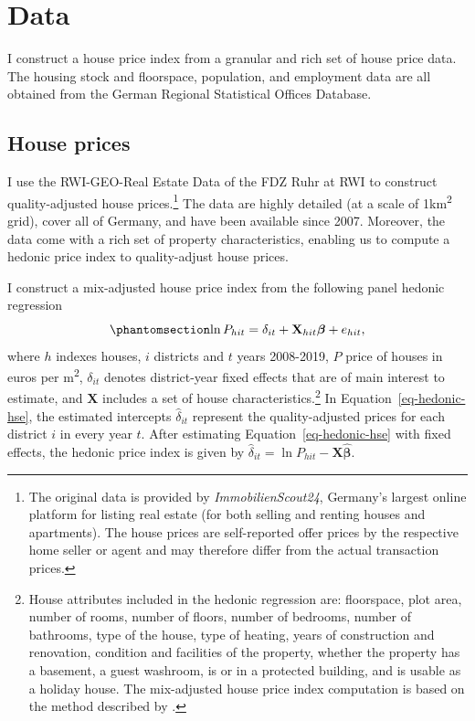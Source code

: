 \documentclass[
  12pt,
]{article}
\begin{document}
\section{Data}\label{data}

I construct a house price index from a granular and rich set of house
price data. The housing stock and floorspace, population, and employment
data are all obtained from the German Regional Statistical Offices
Database.

\subsection{House prices}\label{sec-hedonic-hse}

I use the RWI-GEO-Real Estate Data of the FDZ Ruhr at RWI
\citep{rwi_redhk_2020} to construct quality-adjusted house
prices.\footnote{The original data is provided by
  \emph{ImmobilienScout24}, Germany's largest online platform for
  listing real estate (for both selling and renting houses and
  apartments). The house prices are self-reported offer prices by the
  respective home seller or agent and may therefore differ from the
  actual transaction prices.} The data are highly detailed (at a scale
of 1km\textsuperscript{2} grid), cover all of Germany, and have been
available since 2007. Moreover, the data come with a rich set of
property characteristics, enabling us to compute a hedonic price index
to quality-adjust house prices.

I construct a mix-adjusted house price index from the following panel
hedonic regression
\begin{equation}\phantomsection\label{eq-hedonic-hse}{
\ln P_{hit} = \delta_{it} + \mathbf{X}_{hit}\boldsymbol{\beta} + e_{hit},
}\end{equation} where \(h\) indexes houses, \(i\) districts and \(t\)
years 2008-2019, \(P\) price of houses in euros per
m\textsuperscript{2}, \(\delta_{it}\) denotes district-year fixed
effects that are of main interest to estimate, and \(\mathbf{X}\)
includes a set of house characteristics.\footnote{House attributes
  included in the hedonic regression are: floorspace, plot area, number
  of rooms, number of floors, number of bedrooms, number of bathrooms,
  type of the house, type of heating, years of construction and
  renovation, condition and facilities of the property, whether the
  property has a basement, a guest washroom, is or in a protected
  building, and is usable as a holiday house. The mix-adjusted house
  price index computation is based on the method described by
  \citet{ahlfeldt_etal_2020}.} In Equation~\ref{eq-hedonic-hse}, the
estimated intercepts \(\widehat{\delta}_{it}\) represent the
quality-adjusted prices for each district \(i\) in every year \(t\).
After estimating Equation~\ref{eq-hedonic-hse} with fixed effects, the
hedonic price index is given by
\(\widehat{\delta}_{it} = \ln P_{hit} - \mathbf{X}\boldsymbol{\widehat{\beta}}\).
\end{document}
